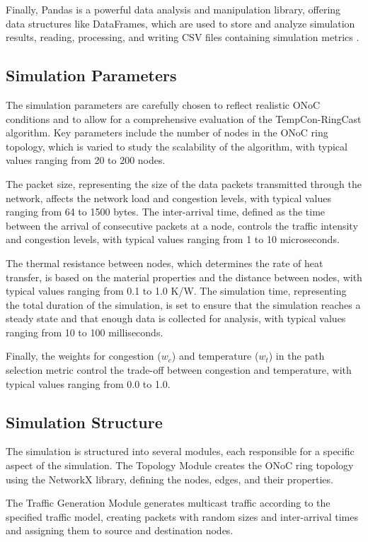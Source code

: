 \documentclass[12pt]{article}
\begin{document}
Finally, Pandas is a powerful data analysis and manipulation library, offering data structures like DataFrames, which are used to store and analyze simulation results, reading, processing, and writing CSV files containing simulation metrics \cite{mckinney2010data}.

\subsection{Simulation Parameters}
The simulation parameters are carefully chosen to reflect realistic ONoC conditions and to allow for a comprehensive evaluation of the TempCon-RingCast algorithm. Key parameters include the number of nodes in the ONoC ring topology, which is varied to study the scalability of the algorithm, with typical values ranging from 20 to 200 nodes.

The packet size, representing the size of the data packets transmitted through the network, affects the network load and congestion levels, with typical values ranging from 64 to 1500 bytes. The inter-arrival time, defined as the time between the arrival of consecutive packets at a node, controls the traffic intensity and congestion levels, with typical values ranging from 1 to 10 microseconds.

The thermal resistance between nodes, which determines the rate of heat transfer, is based on the material properties and the distance between nodes, with typical values ranging from 0.1 to 1.0 K/W. The simulation time, representing the total duration of the simulation, is set to ensure that the simulation reaches a steady state and that enough data is collected for analysis, with typical values ranging from 10 to 100 milliseconds.

Finally, the weights for congestion ($w_c$) and temperature ($w_t$) in the path selection metric control the trade-off between congestion and temperature, with typical values ranging from 0.0 to 1.0.

\subsection{Simulation Structure}
The simulation is structured into several modules, each responsible for a specific aspect of the simulation. The Topology Module creates the ONoC ring topology using the NetworkX library, defining the nodes, edges, and their properties.

The Traffic Generation Module generates multicast traffic according to the specified traffic model, creating packets with random sizes and inter-arrival times and assigning them to source and destination nodes.
\end{document}
